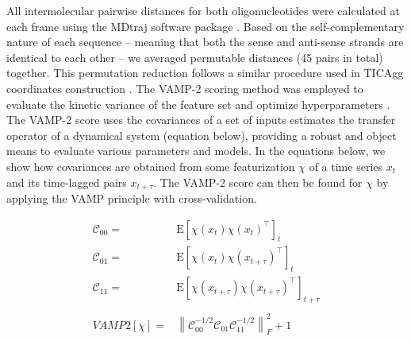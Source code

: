\documentclass[journal=jpcbfk,manuscript=article]{achemso}
\newcommand{\Expect}[1]{\mathrm{E}\left[#1\right]}
\newcommand{\norm}[1]{\left\lVert#1\right\rVert}
\begin{document}
All intermolecular pairwise distances for both oligonucleotides were calculated at each frame using the MDtraj software package \citep{McGibbon2015MDTraj:Trajectories}. Based on the self-complementary nature of each sequence -- meaning that both the sense and anti-sense strands are identical to each other -- we averaged permutable distances (45 pairs in total) together. This permutation reduction follows a similar procedure used in TICAgg coordinates construction \citep{Sengupta2019AutomatedSelf-assembly}. The VAMP-2 scoring method was employed to evaluate the kinetic variance of the feature set and optimize hyperparameters \citep{WuVariationalData, Mardt2018VAMPnetsKinetics}. The VAMP-2 score uses the covariances of a set of inputs estimates the transfer operator of a dynamical system (equation below), providing a robust and object means to evaluate various parameters and models. In the equations below, we show how covariances are obtained from some featurization $\chi$ of a time series $x_t$ and its time-lagged pairs $x_{t+\tau}$. The VAMP-2 score can then be found for $\chi$ by applying the VAMP principle with cross-validation.

\begin{align*}
 	\mathscr{C}_{00}=&\Expect{\chi(x_t)\chi(x_t)^\intercal}_t\\
 	\mathscr{C}_{01}=&\Expect{\chi(x_t)\chi(x_{t+\tau})^\intercal}_t\\
 	\mathscr{C}_{11}=&\Expect{\chi(x_{t+\tau})\chi(x_{t+\tau})^\intercal}_{t+\tau}\\
	\\
 	VAMP2[\chi]=&\norm{\mathscr{C}_{00}^{-1/2}\mathscr{C}_{01}\mathscr{C}_{11}^{-1/2}}_F^2 +1
\end{align*}\label{CK1}

\end{document}
